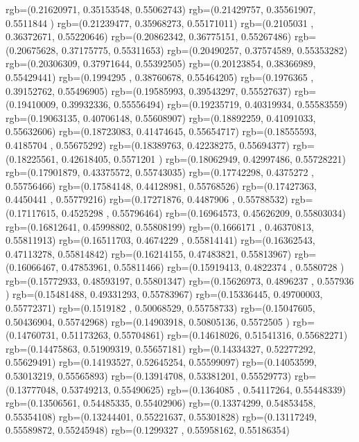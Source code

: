 {{{		  rgb=(0.21620971,  0.35153548,  0.55062743)
		  rgb=(0.21429757,  0.35561907,  0.5511844 )
		  rgb=(0.21239477,  0.35968273,  0.55171011)
		  rgb=(0.2105031 ,  0.36372671,  0.55220646)
		  rgb=(0.20862342,  0.36775151,  0.55267486)
		  rgb=(0.20675628,  0.37175775,  0.55311653)
		  rgb=(0.20490257,  0.37574589,  0.55353282)
		  rgb=(0.20306309,  0.37971644,  0.55392505)
		  rgb=(0.20123854,  0.38366989,  0.55429441)
		  rgb=(0.1994295 ,  0.38760678,  0.55464205)
		  rgb=(0.1976365 ,  0.39152762,  0.55496905)
		  rgb=(0.19585993,  0.39543297,  0.55527637)
		  rgb=(0.19410009,  0.39932336,  0.55556494)
		  rgb=(0.19235719,  0.40319934,  0.55583559)
		  rgb=(0.19063135,  0.40706148,  0.55608907)
		  rgb=(0.18892259,  0.41091033,  0.55632606)
		  rgb=(0.18723083,  0.41474645,  0.55654717)
		  rgb=(0.18555593,  0.4185704 ,  0.55675292)
		  rgb=(0.18389763,  0.42238275,  0.55694377)
		  rgb=(0.18225561,  0.42618405,  0.5571201 )
		  rgb=(0.18062949,  0.42997486,  0.55728221)
		  rgb=(0.17901879,  0.43375572,  0.55743035)
		  rgb=(0.17742298,  0.4375272 ,  0.55756466)
		  rgb=(0.17584148,  0.44128981,  0.55768526)
		  rgb=(0.17427363,  0.4450441 ,  0.55779216)
		  rgb=(0.17271876,  0.4487906 ,  0.55788532)
		  rgb=(0.17117615,  0.4525298 ,  0.55796464)
		  rgb=(0.16964573,  0.45626209,  0.55803034)
		  rgb=(0.16812641,  0.45998802,  0.55808199)
		  rgb=(0.1666171 ,  0.46370813,  0.55811913)
		  rgb=(0.16511703,  0.4674229 ,  0.55814141)
		  rgb=(0.16362543,  0.47113278,  0.55814842)
		  rgb=(0.16214155,  0.47483821,  0.55813967)
		  rgb=(0.16066467,  0.47853961,  0.55811466)
		  rgb=(0.15919413,  0.4822374 ,  0.5580728 )
		  rgb=(0.15772933,  0.48593197,  0.55801347)
		  rgb=(0.15626973,  0.4896237 ,  0.557936  )
		  rgb=(0.15481488,  0.49331293,  0.55783967)
		  rgb=(0.15336445,  0.49700003,  0.55772371)
		  rgb=(0.1519182 ,  0.50068529,  0.55758733)
		  rgb=(0.15047605,  0.50436904,  0.55742968)
		  rgb=(0.14903918,  0.50805136,  0.5572505 )
		  rgb=(0.14760731,  0.51173263,  0.55704861)
		  rgb=(0.14618026,  0.51541316,  0.55682271)
		  rgb=(0.14475863,  0.51909319,  0.55657181)
		  rgb=(0.14334327,  0.52277292,  0.55629491)
		  rgb=(0.14193527,  0.52645254,  0.55599097)
		  rgb=(0.14053599,  0.53013219,  0.55565893)
		  rgb=(0.13914708,  0.53381201,  0.55529773)
		  rgb=(0.13777048,  0.53749213,  0.55490625)
		  rgb=(0.1364085 ,  0.54117264,  0.55448339)
		  rgb=(0.13506561,  0.54485335,  0.55402906)
		  rgb=(0.13374299,  0.54853458,  0.55354108)
		  rgb=(0.13244401,  0.55221637,  0.55301828)
		  rgb=(0.13117249,  0.55589872,  0.55245948)
		  rgb=(0.1299327 ,  0.55958162,  0.55186354)
}}}
